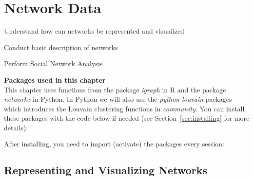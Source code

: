 \chapter{Network Data}
\label{chap:network}

\begin{abstract}{Abstract}

Many types of data, especially social media data, can often be represented as networks. This chapter introduces \emph{igraph} (R and Python) and \emph{networkx} (Python) to showcase how to deal with such data, perform Social Network Analysis (SNA), and represent it visually.
\end{abstract}


\begin{objectives}
\item Understand how can networks be represented and visualized
\item Conduct basic description of networks
\item Perform Social Network Analysis
\end{objectives}



\newpage
\begin{feature}
  \textbf{Packages used in this chapter}\\
  This chapter uses functions from the package \emph{igraph} in R and the package \emph{networkx} in Python.
  In Python we will also use the \emph{python-louvain} packages which introduces the Louvain clustering functions in \emph{community}.
  You can install these packages with the code below if needed  (see Section~\ref{sec:installing} for more details):


\noindent After installing, you need to import (activate) the packages every session:

\end{feature}


%

\section{Representing and Visualizing Networks}
\label{sec:graph}

